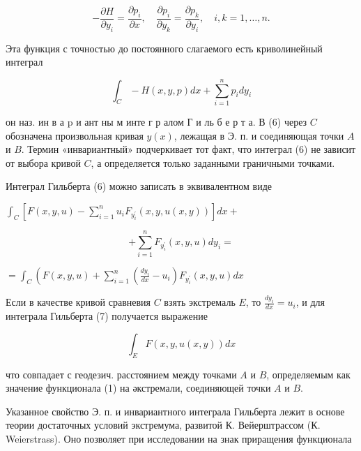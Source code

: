 \documentclass[10pt]{article}
\begin{document}
\[

-\frac{\partial H}{\partial y_{i}}=\frac{\partial p_{i}}{\partial x}, \quad \frac{\partial p_{i}}{\partial y_{k}}=\frac{\partial p_{k}}{\partial y_{i}}, \quad i, k=1, \ldots, n .

\]



Эта функция с точностью до постоянного слагаемого есть криволинейный интеграл



\[

\int_{C}-H(x, y, p) d x+\sum_{i=1}^{n} p_{i} d y_{i}

\]



он наз. ин в а $\mathrm{p}$ и ант ны м инте г р алом Г и ль б е р т а. В (6) через $C$ обозначена произвольная кривая $y(x)$, лежащая в Э. п. и соединяющая точки $A$ и $B$. Термин «инвариантный» подчеркивает тот факт, что интеграл (6) не зависит от выбора кривой $C$, а определяется только заданными граничными точками.



Интеграл Гильберта (6) можно записать в эквивалентном виде



$\int_{C}\left[F(x, y, u)-\sum_{i=1}^{n} u_{i} F_{y_{i}^{\prime}}(x, y, u(x, y))\right] d x+$



\[

+\sum_{i=1}^{n} F_{y_{i}^{\prime}}(x, y, u) d y_{i}=

\]



$=\int_{C}\left(F(x, y, u)+\sum_{i=1}^{n}\left(\frac{d y_{i}}{d x}-u_{i}\right) F_{y_{i}^{\prime}}(x, y, u) d x\right.$



Если в качестве кривой сравневия $C$ взять экстремаль $E$, то $\frac{d y_{i}}{d x}=u_{i}$, и для интеграла Гильберта (7) получается выражение



\[

\int_{E} F(x, y, u(x, y)) d x

\]



что совпадает с геодезич. расстоянием между точками $A$ и $B$, определяемым как значение функционала (1) на әкстремали, соединяющей точки $A$ и $B$.



Указанное свойство Э. п. и инвариантного интеграла Гильберта лежит в основе теории достаточных условий экстремума, развитой К. Вейерштрассом (К. Weierstrass). Оно позволяет при исследовании на знак приращения функционала
\end{document}
